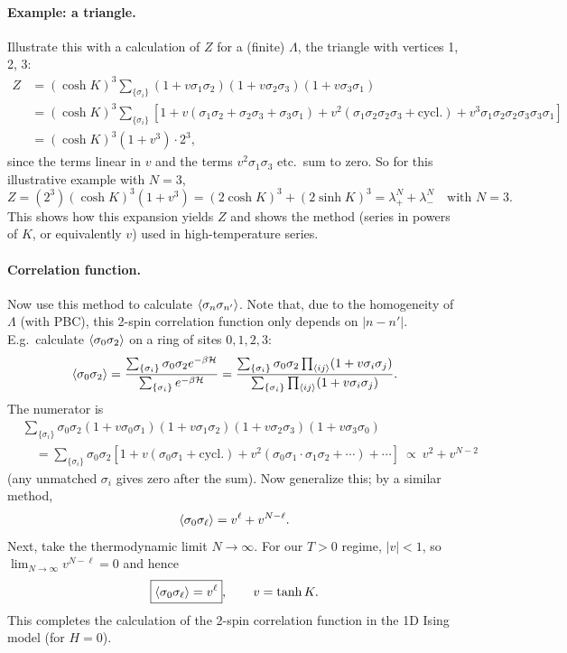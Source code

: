 \paragraph{Example: a triangle.} Illustrate this with a calculation of $Z$ for a (finite)
$\Lambda$, the triangle with vertices 1, 2, 3:
\begin{align}
  Z &= (\cosh K)^3\sum_{\{\sigma_i\}}(1+v\sigma_1\sigma_2)(1+v\sigma_2\sigma_3)(1+v\sigma_3\sigma_1)\nonumber\\
    &= (\cosh K)^3\sum_{\{\sigma_i\}}\left[1 + v(\sigma_1\sigma_2+\sigma_2\sigma_3+\sigma_3\sigma_1)
       + v^2(\sigma_1\sigma_2\sigma_2\sigma_3+\text{cycl.}) + v^3\sigma_1\sigma_2\sigma_2\sigma_3\sigma_3\sigma_1\right]\nonumber\\
    &= (\cosh K)^3(1+v^3)\cdot 2^3 ,
\end{align}
since the terms linear in $v$ and the terms $v^2\sigma_1\sigma_3$ etc.\ sum to zero. So for this
illustrative example with $N = 3$,
\begin{equation}
  Z = (2^3)(\cosh K)^3(1+v^3) = (2\cosh K)^3 + (2\sinh K)^3 = \lambda_+^N+\lambda_-^N\quad\text{with } N = 3 .
\end{equation}
This shows how this expansion yields $Z$ and shows the method (series in powers of $K$, or
equivalently $v$) used in high-temperature series.

\paragraph{Correlation function.} Now use this method to calculate $\langle \sigma_n\sigma_{n'}\rangle$.
Note that, due to the homogeneity of $\Lambda$ (with PBC), this 2-spin correlation function
only depends on $|n-n'|$. E.g.\ calculate $\langle \sigma_0\sigma_2\rangle$ on a ring of sites
$0,1,2,3$:
\begin{equation}
  \langle \sigma_0\sigma_2\rangle = \frac{\sum_{\{\sigma_i\}}\sigma_0\sigma_2e^{-\beta\mathcal{H}}}{\sum_{\{\sigma_i\}}e^{-\beta\mathcal{H}}}
  = \frac{\sum_{\{\sigma_i\}}\sigma_0\sigma_2\prod_{\langle ij\rangle}(1+v\sigma_i\sigma_j)}{\sum_{\{\sigma_i\}}\prod_{\langle ij\rangle}(1+v\sigma_i\sigma_j)}.
\end{equation}
The numerator is
\begin{align}
  &\sum_{\{\sigma_i\}}\sigma_0\sigma_2(1+v\sigma_0\sigma_1)(1+v\sigma_1\sigma_2)(1+v\sigma_2\sigma_3)(1+v\sigma_3\sigma_0)\nonumber\\
  &\quad= \sum_{\{\sigma_i\}}\sigma_0\sigma_2\left[1 + v(\sigma_0\sigma_1+\text{cycl.}) + v^2(\sigma_0\sigma_1\cdot\sigma_1\sigma_2+\cdots)+\cdots\right]
  \ \propto\ v^2 + v^{N-2}
\end{align}
(any unmatched $\sigma_i$ gives zero after the sum). Now generalize this; by a similar method,
\begin{equation}
  \langle \sigma_0\sigma_\ell\rangle = v^\ell + v^{N-\ell}.
\end{equation}
Next, take the thermodynamic limit $N\to\infty$. For our $T>0$ regime, $|v|<1$, so
$\lim_{N\to\infty}v^{N-\ell} = 0$ and hence
\begin{equation}
  \boxed{\langle \sigma_0\sigma_\ell\rangle = v^\ell},\qquad v = \tanh K .
\end{equation}
This completes the calculation of the 2-spin correlation function in the 1D Ising model
(for $H = 0$).
